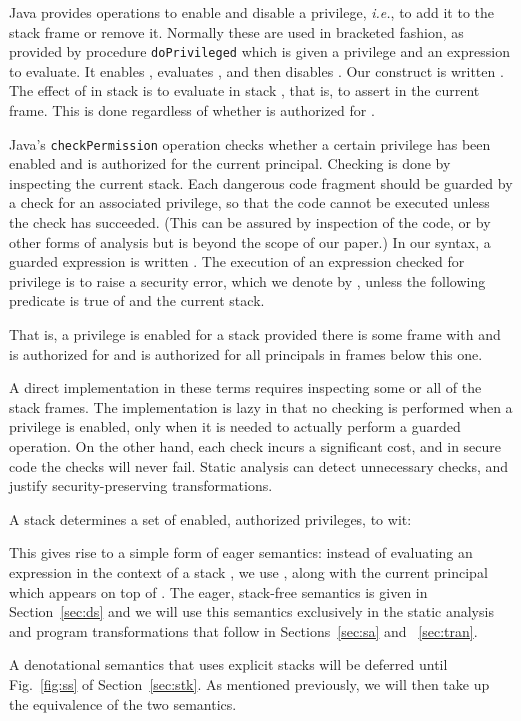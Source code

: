 \documentclass[submission,copyright,creativecommons]{eptcs}
\newcommand{\ie}{{\em i.e.}}
\begin{document}
Java provides operations to enable and disable a privilege, \ie, to
add it to the stack frame or remove it.  Normally these are used in
bracketed fashion, as provided by procedure \texttt{doPrivileged} which is given a
privilege  and an expression  to evaluate.  It enables ,
evaluates , and then disables .  Our construct is written
.  The effect of  in stack
 is to evaluate  in stack
, that is, to assert  in the
current frame.
This is done regardless of whether  is authorized for .


Java's \texttt{checkPermission} operation checks whether a certain
privilege has been enabled and is authorized for the current
principal.  Checking is done by inspecting the current stack.  Each
dangerous code fragment should be guarded by a check for an associated
privilege, so that the code cannot be executed unless the check has succeeded.  
(This can be assured by inspection of the code, or by other forms of analysis 
\cite{CentonzeFP07} but is beyond the scope of our paper.)
In our syntax, a guarded expression is written
.  The execution of an expression checked for privilege
 is to raise a security error, which we denote by , unless
the following predicate is true of  and the current stack.

That is, a privilege is enabled for a stack provided
there is some frame  with  and  is authorized for
 and is authorized for all principals in frames below this one. 



A direct implementation in these terms requires inspecting some or all
of the stack frames.  The implementation is lazy in that no
checking is performed when a privilege is enabled, only when it is
needed to actually perform a guarded operation. On the other hand,
each check incurs a significant cost, and in secure code the checks
will never fail.  Static analysis can detect unnecessary checks, and
justify security-preserving transformations.

A stack  determines a set  of enabled, authorized
privileges, to wit:

This gives rise to a simple form of eager semantics: instead of
evaluating an expression in the context of a stack , we use
, along with the current principal which appears on top of
.  The eager, stack-free semantics is given in Section~\ref{sec:ds}
and we will use this semantics exclusively in the static analysis and 
program transformations that follow in Sections~\ref{sec:sa} and ~\ref{sec:tran}.

A denotational semantics that uses explicit stacks will be deferred until Fig.~\ref{fig:ss} of Section~\ref{sec:stk}. As mentioned previously, we will then take up the equivalence of the two semantics.
\end{document}
